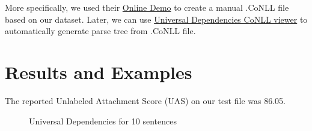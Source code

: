 \documentclass[12pt, a4paper]{article}
\begin{document}
More specifically, we used their \href{http://stanza.run/}{Online Demo} to create a manual .CoNLL file based on our dataset. Later, we can use \href{https://universaldependencies.org/conllu_viewer.html}{Universal Dependencies CoNLL viewer} to automatically generate parse tree from .CoNLL file.

\section*{Results and Examples}

The reported Unlabeled Attachment Score (UAS) on our test file was 86.05.

\begin{figure}[H]
	\caption{Universal Dependencies for 10 sentences}
	\label{parsing_examples}
\end{figure}
\end{document}
